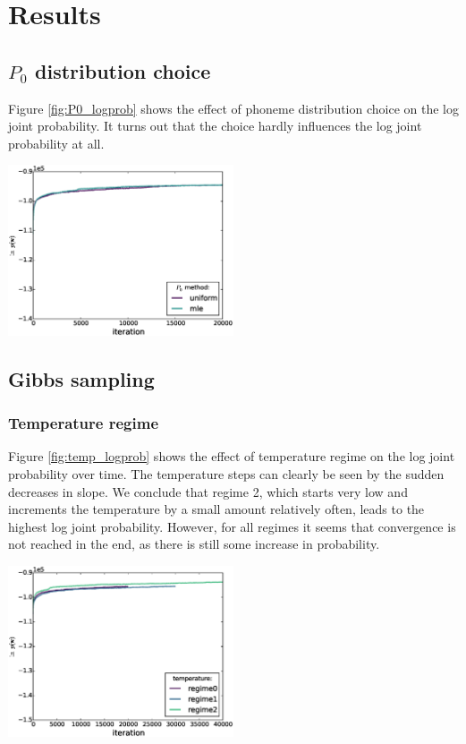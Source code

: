 \section{Results}

\subsection{$P_0$ distribution choice}

Figure \ref{fig:P0_logprob} shows the effect of phoneme distribution choice on the log joint probability. It turns out that the choice hardly influences the log joint probability at all.

\begingroup
    \centering
    \includegraphics[width=0.5\textwidth]{images/P0_method-log_prob}
    \label{fig:P0_logprob}
\endgroup

\subsection{Gibbs sampling}

\subsubsection{Temperature regime}

Figure \ref{fig:temp_logprob} shows the effect of temperature regime on the log joint probability over time. The temperature steps can clearly be seen by the sudden decreases in slope. We conclude that regime 2, which starts very low and increments the temperature by a small amount relatively often, leads to the highest log joint probability. However, for all regimes it seems that convergence is not reached in the end, as there is still some increase in probability.  

\begingroup
    \centering
    \includegraphics[width=0.5\textwidth]{images/temperature-log_prob}
	\label{fig:temp_logprob}
\endgroup


